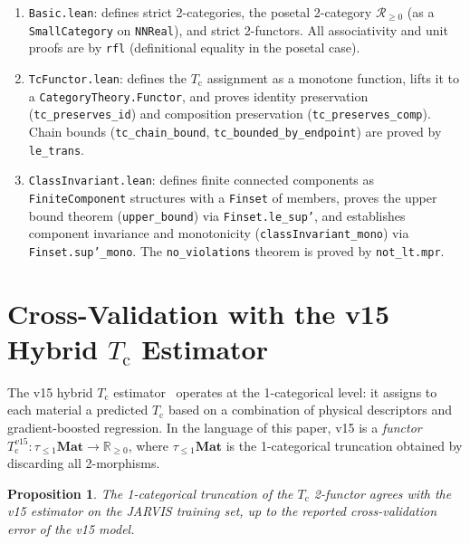 \documentclass[12pt,a4paper]{article}
\theoremstyle{plain}
\newtheorem{proposition}[theorem]{Proposition}
\theoremstyle{definition}
\theoremstyle{remark}
\newcommand{\Tc}{T_{\mathrm{c}}}
\newcommand{\Rgeq}{\mathbb{R}_{\geq 0}}
\newcommand{\Matl}{\mathbf{Mat}}
\begin{document}
\begin{enumerate}
  \item \texttt{Basic.lean}: defines strict 2-categories, the posetal
    2-category $\mathscr{R}_{\geq 0}$ (as a \texttt{SmallCategory} on
    \texttt{NNReal}), and strict 2-functors.  All associativity and
    unit proofs are by \texttt{rfl} (definitional equality in the
    posetal case).

  \item \texttt{TcFunctor.lean}: defines the $\Tc$ assignment as a
    monotone function, lifts it to a \texttt{CategoryTheory.Functor},
    and proves identity preservation
    (\texttt{tc\_preserves\_id}) and composition preservation
    (\texttt{tc\_preserves\_comp}).  Chain bounds
    (\texttt{tc\_chain\_bound}, \texttt{tc\_bounded\_by\_endpoint})
    are proved by \texttt{le\_trans}.

  \item \texttt{ClassInvariant.lean}: defines finite connected
    components as \texttt{FiniteComponent} structures with a
    \texttt{Finset} of members, proves the upper bound theorem
    (\texttt{upper\_bound}) via \texttt{Finset.le\_sup'}, and
    establishes component invariance and monotonicity
    (\texttt{classInvariant\_mono}) via \texttt{Finset.sup'\_mono}.
    The \texttt{no\_violations} theorem is proved by
    \texttt{not\_lt.mpr}.
\end{enumerate}


\section{Cross-Validation with the v15 Hybrid $\Tc$ Estimator}
\label{sec:cross-val}

The v15 hybrid $\Tc$ estimator~\cite{placeholder_v15} operates at the
1-categorical level: it assigns to each material a predicted $\Tc$ based
on a combination of physical descriptors and gradient-boosted regression.
In the language of this paper, v15 is a \emph{functor}
$\Tc^{v15} \colon \tau_{\leq 1}\Matl \to \Rgeq$, where
$\tau_{\leq 1}\Matl$ is the 1-categorical truncation obtained by discarding
all 2-morphisms.

\begin{proposition}\label{prop:truncation}
The 1-categorical truncation of the $\Tc$ 2-functor agrees with the v15
estimator on the JARVIS training set, up to the reported cross-validation
error of the v15 model.
\end{proposition}
\end{document}
